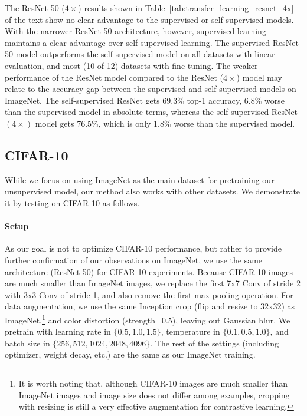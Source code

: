 \documentclass{article}
\begin{document}
The ResNet-50 ($4\times$) results shown in Table~\ref{tab:transfer_learning_resnet_4x} of the text show no clear advantage to the supervised or self-supervised models. With the narrower ResNet-50 architecture, however, supervised learning maintains a clear advantage over self-supervised learning. The supervised ResNet-50 model outperforms the self-supervised model on all datasets with linear evaluation, and most (10 of 12) datasets with fine-tuning. The weaker performance of the ResNet model compared to the ResNet ($4\times$) model may relate to the accuracy gap between the supervised and self-supervised models on ImageNet. The self-supervised ResNet gets 69.3\% top-1 accuracy, 6.8\% worse than the supervised model in absolute terms, whereas the self-supervised ResNet $(4\times)$ model gets 76.5\%, which is only 1.8\% worse than the supervised model.



\subsection{CIFAR-10}
\label{app:cifar}
While we focus on using ImageNet as the main dataset for pretraining our unsupervised model, our method also works with other datasets. We demonstrate it by testing on CIFAR-10 as follows.

\paragraph{Setup} As our goal is not to optimize CIFAR-10 performance, but rather to provide further confirmation of our observations on ImageNet, we use the same architecture (ResNet-50) for CIFAR-10 experiments. Because CIFAR-10 images are much smaller than ImageNet images, we replace the first 7x7 Conv of stride 2 with 3x3 Conv of stride 1, and also remove the first max pooling operation. For data augmentation, we use the same Inception crop (flip and resize to 32x32) as ImageNet,\footnote{It is worth noting that, although CIFAR-10 images are much smaller than ImageNet images and image size does not differ among examples, cropping with resizing is still a very effective augmentation for contrastive learning.} and color distortion (strength=0.5), leaving out Gaussian blur. We pretrain with learning rate in $\{0.5, 1.0, 1.5\}$, temperature in $\{0.1, 0.5, 1.0\}$, and batch size in $\{256, 512, 1024, 2048, 4096\}$. The rest of the settings (including optimizer, weight decay, etc.) are the same as our ImageNet training.
\end{document}
